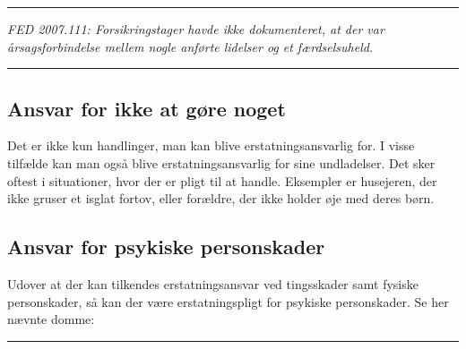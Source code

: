 \documentclass[]{book}
\begin{document}
\begin{center}\rule{0.5\linewidth}{\linethickness}\end{center}

\emph{FED 2007.111: Forsikringstager havde ikke dokumenteret, at der var årsagsforbindelse mellem nogle anførte lidelser og et færdselsuheld.}

\begin{center}\rule{0.5\linewidth}{\linethickness}\end{center}

\hypertarget{ansvar-for-ikke-at-gre-noget}{%
\subsection{Ansvar for ikke at gøre noget}\label{ansvar-for-ikke-at-gre-noget}}

Det er ikke kun handlinger, man kan blive erstatningsansvarlig for. I visse tilfælde kan man også blive erstatningsansvarlig for sine undladelser. Det sker oftest i situationer, hvor der er pligt til at handle. Eksempler er husejeren, der ikke gruser et isglat fortov, eller forældre, der ikke holder øje med deres børn.

\hypertarget{ansvar-for-psykiske-personskader}{%
\subsection{Ansvar for psykiske personskader}\label{ansvar-for-psykiske-personskader}}

Udover at der kan tilkendes erstatningsansvar ved tingsskader samt fysiske personskader, så kan der være erstatningspligt for psykiske personskader. Se her nævnte domme:

\begin{center}\rule{0.5\linewidth}{\linethickness}\end{center}
\end{document}

